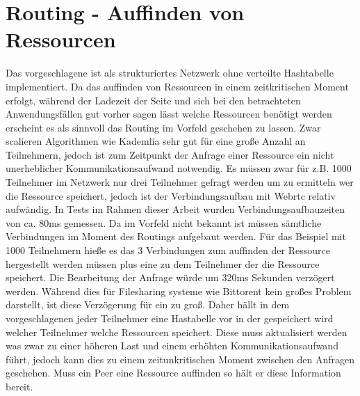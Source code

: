 \section{Routing - Auffinden von Ressourcen}

Das vorgeschlagene \pTp \cdn ist als strukturiertes \pTp Netzwerk ohne verteilte Hashtabelle implementiert. Da das auffinden von Ressourcen in einem zeitkritischen Moment erfolgt, während der Ladezeit der Seite und sich bei den betrachteten Anwendungsfällen gut vorher sagen lässt welche Ressourcen benötigt werden erscheint es als sinnvoll das Routing im Vorfeld geschehen zu lassen. Zwar scalieren Algorithmen wie Kademlia \cite{kademlia} sehr gut für eine große Anzahl an Teilnehmern, jedoch ist zum Zeitpunkt der Anfrage einer Ressource ein nicht unerheblicher Kommunikationsaufwand notwendig. Es müssen zwar für z.B. 1000 Teilnehmer im Netzwerk nur drei Teilnehmer gefragt werden um zu ermitteln wer die Ressource speichert, jedoch ist der Verbindungsaufbau mit Webrtc relativ aufwändig. In Tests im Rahmen dieser Arbeit wurden Verbindungsaufbauzeiten von ca. 80ms gemessen. Da im Vorfeld nicht bekannt ist müssen sämtliche Verbindungen im Moment des Routings aufgebaut werden. Für das Beispiel mit 1000 Teilnehmern hieße es das 3 Verbindungen zum auffinden der Ressource hergestellt werden müssen plus eine zu dem Teilnehmer der die Ressource speichert. Die Bearbeitung der Anfrage würde um 320ms Sekunden verzögert werden. Während dies für Filesharing systeme wie Bittorent kein großes Problem darstellt, ist diese Verzögerung für ein \cdn zu groß. Daher hällt in dem vorgeschlagenen \cdn jeder Teilnehmer eine Hastabelle vor in der gespeichert wird welcher Teilnehmer welche Ressourcen speichert. Diese muss aktualisiert werden was zwar zu einer höheren Last und einem erhöhten Kommunikationsaufwand führt, jedoch kann dies zu einem zeitunkritischen Moment zwischen den Anfragen geschehen. Muss ein Peer eine Ressource auffinden so hält er diese Information bereit. 

